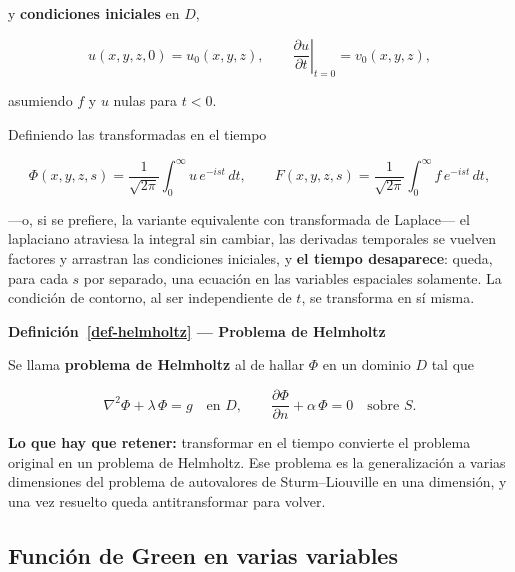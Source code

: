 \documentclass[
  spanish,
  a4paper,
]{scrbook}
\theoremstyle{definition}
\theoremstyle{plain}
\theoremstyle{definition}
\theoremstyle{plain}
\theoremstyle{definition}
\theoremstyle{remark}
\begin{document}
y \textbf{condiciones iniciales} en \(D\),

\[
u(x,y,z,0) = u_0(x,y,z), \qquad
\left.\frac{\partial u}{\partial t}\right|_{t=0} = v_0(x,y,z) ,
\]

asumiendo \(f\) y \(u\) nulas para \(t<0\).

Definiendo las transformadas en el tiempo

\[
\Phi(x,y,z,s) = \frac{1}{\sqrt{2\pi}}\int_0^{\infty} u\,e^{-ist}\,dt, \qquad
F(x,y,z,s) = \frac{1}{\sqrt{2\pi}}\int_0^{\infty} f\,e^{-ist}\,dt ,
\]

---o, si se prefiere, la variante equivalente con transformada de
Laplace--- el laplaciano atraviesa la integral sin cambiar, las
derivadas temporales se vuelven factores y arrastran las condiciones
iniciales, y \textbf{el tiempo desaparece}: queda, para cada \(s\) por
separado, una ecuación en las variables espaciales solamente. La
condición de contorno, al ser independiente de \(t\), se transforma en
sí misma.

\begin{tcolorbox}[enhanced jigsaw, arc=.35mm, bottomrule=.15mm, breakable, colback=white, colframe=quarto-callout-note-color-frame, left=2mm, leftrule=.75mm, opacityback=0, rightrule=.15mm, toprule=.15mm]
\begin{minipage}[t]{5.5mm}
\textcolor{quarto-callout-note-color}{\faInfo}
\end{minipage}%
\begin{minipage}[t]{\textwidth - 5.5mm}

\vspace{-3mm}\textbf{Definición~\ref{def-helmholtz} --- Problema de Helmholtz}\vspace{3mm}

Se llama \textbf{problema de Helmholtz} al de hallar \(\Phi\) en un
dominio \(D\) tal que

\[
\nabla^2\Phi + \lambda\,\Phi = g \quad\text{en } D, \qquad
\frac{\partial\Phi}{\partial n} + \alpha\,\Phi = 0 \quad\text{sobre } S .
\]

\end{minipage}%
\end{tcolorbox}

\textbf{Lo que hay que retener:} transformar en el tiempo convierte el
problema original en un problema de Helmholtz. Ese problema es la
generalización a varias dimensiones del problema de autovalores de
Sturm--Liouville en una dimensión, y una vez resuelto queda
antitransformar para volver.

\subsection{Función de Green en varias variables}\label{sec-resumen-8}
\end{document}
